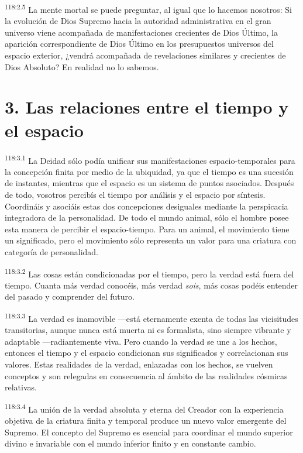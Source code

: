 \documentclass[twoside, 11pt]{book}
\begin{document}
\par
\textsuperscript{118:2.5} La mente mortal se puede preguntar, al igual que lo hacemos nosotros: Si la evolución de Dios Supremo hacia la autoridad administrativa en el gran universo viene acompañada de manifestaciones crecientes de Dios Último, la aparición correspondiente de Dios Último en los presupuestos universos del espacio exterior, ¿vendrá acompañada de revelaciones similares y crecientes de Dios Absoluto? En realidad no lo sabemos.

\section*{3. Las relaciones entre el tiempo y el espacio}
\par
\textsuperscript{118:3.1} La Deidad sólo podía unificar sus manifestaciones espacio-temporales para la concepción finita por medio de la ubiquidad, ya que el tiempo es una sucesión de instantes, mientras que el espacio es un sistema de puntos asociados. Después de todo, vosotros percibís el tiempo por análisis y el espacio por síntesis. Coordináis y asociáis estas dos concepciones desiguales mediante la perspicacia integradora de la personalidad. De todo el mundo animal, sólo el hombre posee esta manera de percibir el espacio-tiempo. Para un animal, el movimiento tiene un significado, pero el movimiento sólo representa un valor para una criatura con categoría de personalidad.

\par
\textsuperscript{118:3.2} Las cosas están condicionadas por el tiempo, pero la verdad está fuera del tiempo. Cuanta más verdad conocéis, más verdad \textit{sois}, más cosas podéis entender del pasado y comprender del futuro.

\par
\textsuperscript{118:3.3} La verdad es inamovible ---está eternamente exenta de todas las vicisitudes transitorias, aunque nunca está muerta ni es formalista, sino siempre vibrante y adaptable ---radiantemente viva. Pero cuando la verdad se une a los hechos, entonces el tiempo y el espacio condicionan sus significados y correlacionan sus valores. Estas realidades de la verdad, enlazadas con los hechos, se vuelven conceptos y son relegadas en consecuencia al ámbito de las realidades cósmicas relativas.

\par
\textsuperscript{118:3.4} La unión de la verdad absoluta y eterna del Creador con la experiencia objetiva de la criatura finita y temporal produce un nuevo valor emergente del Supremo. El concepto del Supremo es esencial para coordinar el mundo superior divino e invariable con el mundo inferior finito y en constante cambio.
\end{document}
